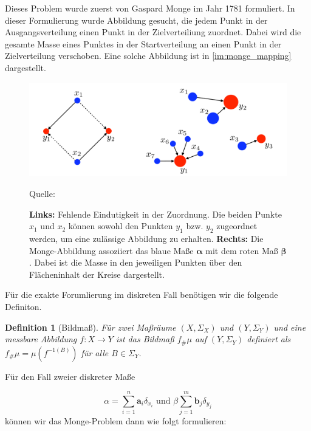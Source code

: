 \documentclass[11pt,a4paper]{article}
\newcommand{\source}[1]{\caption*{\hfill Quelle: {#1}} }
\newtheorem{definition}[theorem]{Definition}
\numberwithin{equation}{section}
\begin{document}
	Dieses Problem wurde zuerst von Gaspard Monge im Jahr 1781 formuliert. In dieser Formulierung wurde Abbildung gesucht, die jedem Punkt in der Ausgangsverteilung einen Punkt in der Zielverteiliung zuordnet. Dabei wird die gesamte Masse eines Punktes in der Startverteilung an einen Punkt in der Zielverteilung verschoben. Eine solche Abbildung ist in \autoref{im:monge_mapping} dargestellt.

	
	\begin{figure}[ht]
		\centering
		\includegraphics[width=0.3\textheight]{monge_mapping.png}
		\caption[Monge-Abbildung]{\textbf{Links:} Fehlende Eindutigkeit in der Zuordnung. Die beiden Punkte $x_1$ und $x_2$ können sowohl den Punkten $y_1$ bzw. $y_2$ zugeordnet werden, um eine zulässige Abbildung zu erhalten. \textbf{Rechts:} Die Monge-Abbildung assoziiert das blaue Maße $\boldsymbol{\alpha}$ mit dem roten Maß $\boldsymbol{\beta}$. Dabei ist die Masse in den jeweiligen Punkten über den Flächeninhalt der Kreise dargestellt.}
		\source{\cite{COTcuturi}}
		\label{im:monge_mapping}
	\end{figure}

	Für die exakte Forumlierung im diskreten Fall benötigen wir die folgende Definiton.
	
	\begin{definition}[Bildmaß]
		Für zwei Maßräume $(X,\Sigma_X)$ und $(Y,\Sigma_Y)$ und eine messbare Abbildung $f:X\to Y$ ist das Bildmaß $f_\#\mu$ auf $(Y,\Sigma_Y)$ definiert als $f_\#\mu = \mu (f^{-1(B)})$ für alle $B \in \Sigma_Y$.
	\end{definition}

	Für den Fall zweier diskreter Maße
	
	\begin{equation}
		\alpha = \sum_{i=1}^n{\boldsymbol{a}_i\delta_{x_i}} \text{ und } \beta \sum_{j=1}^m{\boldsymbol{b}_j\delta_{y_j}}
	\end{equation}
	können wir das Monge-Problem dann wie folgt formulieren:
	
\end{document}
